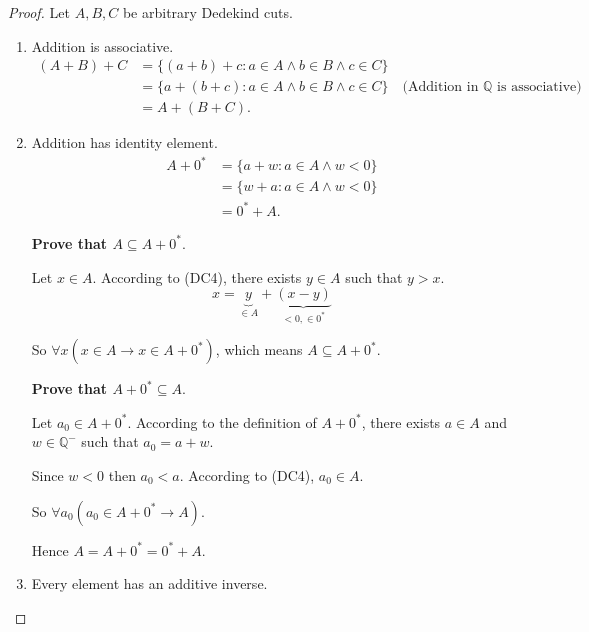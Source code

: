 \begin{proof}
    \par Let $A, B, C$ be arbitrary Dedekind cuts.
    \begin{enumerate}[label = (F\arabic*)]
        \item Addition is associative.
              \begin{align*}
                  (A + B) + C & = \{ (a + b) + c : a\in A\land b\in B\land c\in C \}                                                       \\
                              & = \{ a + (b + c) : a\in A\land b\in B\land c\in C \} \quad\text{(Addition in $\mathbb{Q}$ is associative)} \\
                              & = A + (B + C).
              \end{align*}
        \item Addition has identity element.
              \begin{align*}
                  A + {0}^{*} & = \{ a + w : a\in A\land w < 0 \} \\
                              & = \{ w + a : a\in A\land w < 0 \} \\
                              & = {0}^{*} + A.
              \end{align*}
              \par \textbf{Prove that $A \subseteq A + {0}^{*}$}.
              \par Let $x\in A$. According to (DC4), there exists $y\in A$ such that $y > x$.
              \[
                  x = \underbrace{y}_{\in A} + \underbrace{(x - y)}_{< 0, \in {0}^{*}}
              \]
              \par So $\forall x(x\in A \rightarrow x\in A + {0}^{*})$, which means $A \subseteq A + {0}^{*}$.
              \bigskip
              \par \textbf{Prove that $A + {0}^{*} \subseteq A$}.
              \par Let $a_{0}\in A + {0^{*}}$. According to the definition of $A + {0}^{*}$, there exists $a\in A$ and $w\in\mathbb{Q}^{-}$ such that $a_{0} = a + w$.
              \par Since $w < 0$ then $a_{0} < a$. According to (DC4), $a_{0}\in A$.
              \par So $\forall a_{0}(a_{0}\in A + {0}^{*} \rightarrow A)$.
              \par Hence $A = A + {0}^{*} = {0}^{*} + A$.
        \item Every element has an additive inverse.

\end{enumerate}
\end{proof}
